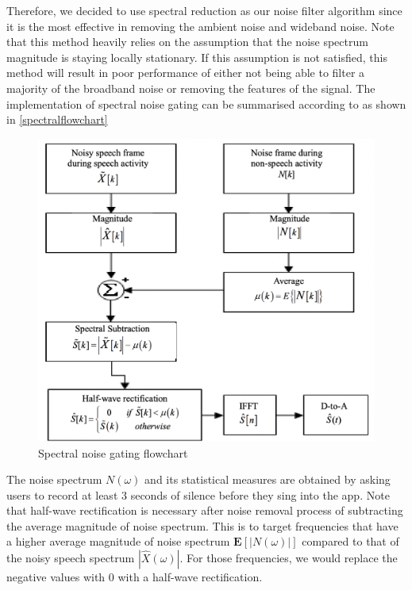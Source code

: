 Therefore, we decided to use spectral reduction as our noise filter algorithm since it is the most effective in removing the ambient noise 
and wideband noise. Note that this method heavily relies on the assumption that the noise spectrum magnitude is staying locally 
stationary. If this assumption is not satisfied, this method will result in poor performance of either not being able to filter a majority of 
the broadband noise or removing the features of the signal.
The implementation of spectral noise gating can be summarised according to \cite{spectralflowchart} as shown in \autoref{spectralflowchart}
\begin{figure}
	\centering
	\includegraphics[scale=0.35]{Figures/spectralprocess.png}
	\caption{Spectral noise gating flowchart}
	\label{spectralflowchart}
\end{figure}
The noise spectrum $N(\omega)$ and its statistical measures are obtained by asking users to record at least 3 seconds of silence 
before they sing into the app.
Note that half-wave rectification is necessary after noise removal process of subtracting the average magnitude of noise spectrum.
This is to target frequencies that have a higher average magnitude of noise spectrum $\textbf{E}[|N(\omega)|]$ compared to that of 
the noisy speech spectrum $|\hat{X}(\omega)|$. For those frequencies, we would replace the negative values with 0 with a half-wave 
rectification.

